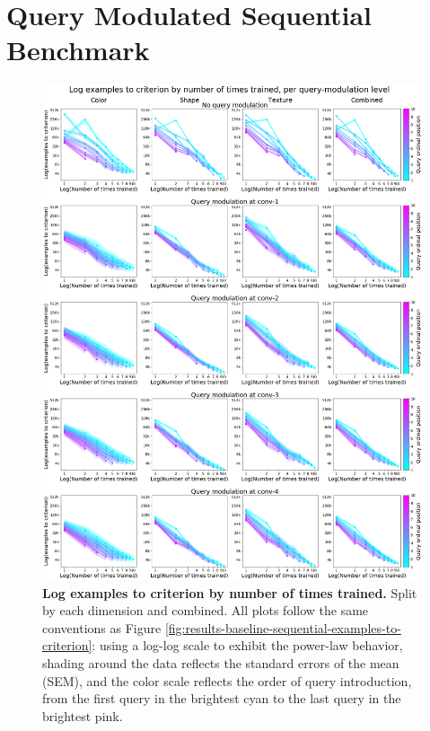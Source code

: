 \FloatBarrier
\section{Query Modulated Sequential Benchmark \label{sec:additional-figures-query-mod-sequential}}

\begin{figure}[!htb]
\centering
\includegraphics[width=\linewidth]{ch-results/figures/query_mod_benchmark/examples_to_criterion_per_modualtion_level_times_trained.png}
\caption[Log examples to criterion by number of times trained.]{ {\bf Log examples to criterion by number of times trained.} Split by each dimension and combined. All plots follow the same conventions as Figure \ref{fig:results-baseline-sequential-examples-to-criterion}: using a log-log scale to exhibit the power-law behavior, shading around the data reflects the standard errors of the mean (SEM), and the color scale reflects the order of query introduction, from the first query in the brightest cyan to the last query in the brightest pink.}
\label{fig:results-query-mod-benchmark-examples-to-criterion-per-modualtion-level-times-trained}
\end{figure}

